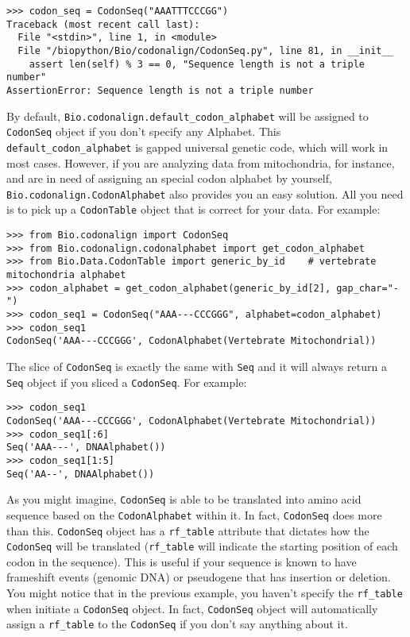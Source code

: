 \begin{verbatim}
>>> codon_seq = CodonSeq("AAATTTCCCGG")
Traceback (most recent call last):
  File "<stdin>", line 1, in <module>
  File "/biopython/Bio/codonalign/CodonSeq.py", line 81, in __init__
    assert len(self) % 3 == 0, "Sequence length is not a triple number"
AssertionError: Sequence length is not a triple number
\end{verbatim}

By default, \verb|Bio.codonalign.default_codon_alphabet| will be
assigned to \verb|CodonSeq| object if you don't specify any Alphabet.
This \verb|default_codon_alphabet| is gapped universal genetic code,
which will work in most cases. However, if you are analyzing data from
mitochondria, for instance, and are in need of assigning an special
codon alphabet by yourself, \verb|Bio.codonalign.CodonAlphabet| also
provides you an easy solution. All you need is to pick up a
\verb|CodonTable| object that is correct for your data. For example:

\begin{verbatim}
>>> from Bio.codonalign import CodonSeq
>>> from Bio.codonalign.codonalphabet import get_codon_alphabet
>>> from Bio.Data.CodonTable import generic_by_id    # vertebrate mitochondria alphabet
>>> codon_alphabet = get_codon_alphabet(generic_by_id[2], gap_char="-")
>>> codon_seq1 = CodonSeq("AAA---CCCGGG", alphabet=codon_alphabet)
>>> codon_seq1
CodonSeq('AAA---CCCGGG', CodonAlphabet(Vertebrate Mitochondrial))
\end{verbatim}

The slice of \verb|CodonSeq| is exactly the same with \verb|Seq| and
it will always return a \verb|Seq| object if you sliced a
\verb|CodonSeq|. For example:

\begin{verbatim}
>>> codon_seq1
CodonSeq('AAA---CCCGGG', CodonAlphabet(Vertebrate Mitochondrial))
>>> codon_seq1[:6]
Seq('AAA---', DNAAlphabet())
>>> codon_seq1[1:5]
Seq('AA--', DNAAlphabet())
\end{verbatim}

As you might imagine, \verb|CodonSeq| is able to be translated into
amino acid sequence based on the \verb|CodonAlphabet| within it. In
fact, \verb|CodonSeq| does more than this. \verb|CodonSeq| object
has a \texttt{rf\_table} attribute that dictates how the
\verb|CodonSeq| will be translated (\texttt{rf\_table} will indicate
the starting position of each codon in the sequence). This is useful if
your sequence is known to have frameshift events (genomic DNA) or
pseudogene that has insertion or deletion. You might notice that in the
previous example, you haven't specify the \texttt{rf\_table} when initiate
a \verb|CodonSeq| object. In fact, \verb|CodonSeq| object will
automatically assign a \texttt{rf\_table} to the \texttt{CodonSeq} if
you don't say anything about it.


